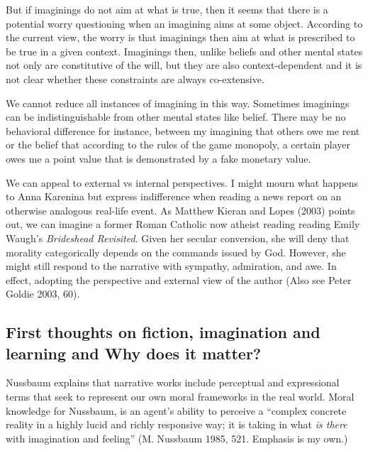 \documentclass[12pt]{book}
\theoremstyle{definition}
\theoremstyle{remark}
\begin{document}
But if imaginings do not aim at what is true, then it seems that there is a potential worry questioning when an imagining aims at some object. According to the current view, the worry is that imaginings then aim at what is prescribed to be true in a given context. Imaginings then, unlike beliefs and other mental states not only are constitutive of the will, but they are also context-dependent and it is not clear whether these constraints are always co-extensive.

We cannot reduce all instances of imagining in this way. Sometimes imaginings can be indistinguishable from other mental states like belief. There may be no behavioral difference for instance, between my imagining that others owe me rent or the belief that according to the rules of the game monopoly, a certain player owes me a point value that is demonstrated by a fake monetary value.

We can appeal to external vs internal perspectives. I might mourn what happens to Anna Karenina but express indifference when reading a news report on an otherwise analogous real-life event. As Matthew Kieran and Lopes (2003) points out, we can imagine a former Roman Catholic now atheist reading reading Emily Waugh's \emph{Brideshead Revisited}. Given her secular conversion, she will deny that morality categorically depends on the commands issued by God. However, she might still respond to the narrative with sympathy, admiration, and awe. In effect, adopting the perspective and external view of the author (Also see Peter Goldie 2003, 60).

\subsection*{First thoughts on fiction, imagination and learning and Why does it matter?}\label{first-thoughts-on-fiction-imagination-and-learning-and-why-does-it-matter}

Nussbaum explains that narrative works include perceptual and expressional terms that seek to represent our own moral frameworks in the real world. Moral knowledge for Nussbaum, is an agent's ability to perceive a ``complex concrete reality in a highly lucid and richly responsive way; it is taking in what \emph{is there} with imagination and feeling'' (M. Nussbaum 1985, 521. Emphasis is my own.)
\end{document}
